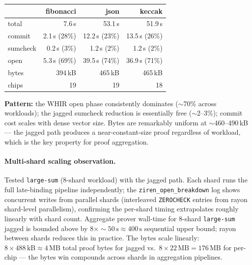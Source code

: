 \begin{tabular}{l@{\hspace{1em}}rrr}
\toprule
                & \textbf{fibonacci} & \textbf{json} & \textbf{keccak} \\
\midrule
total           & 7.6\,s   & 53.1\,s & 51.9\,s \\
commit          & 2.1\,s (28\%) & 12.2\,s (23\%) & 13.5\,s (26\%) \\
sumcheck        & 0.2\,s (3\%)  & 1.2\,s (2\%)   & 1.2\,s (2\%) \\
open            & 5.3\,s (69\%) & 39.5\,s (74\%) & 36.9\,s (71\%) \\
\midrule
bytes           & 394\,kB  & 465\,kB  & 465\,kB \\
chips           & 19       & 19       & 18 \\
\bottomrule
\end{tabular}

\textbf{Pattern:} the WHIR open phase consistently dominates
($\sim$70\% across workloads); the jagged sumcheck reduction is
essentially free ($\sim$2--3\%); commit cost scales with dense vector
size.  Bytes are remarkably uniform at $\sim$460--490\,kB --- the
jagged path produces a near-constant-size proof regardless of
workload, which is the key property for proof aggregation.

\paragraph{Multi-shard scaling observation.}
Tested \texttt{large-sum} (8-shard workload) with the jagged path.
Each shard runs the full late-binding pipeline independently; the
\texttt{ziren\_open\_breakdown} log shows concurrent writes from
parallel shards (interleaved \texttt{ZEROCHECK} entries from rayon
shard-level parallelism), confirming the per-shard timing
extrapolates roughly linearly with shard count.  Aggregate prover
wall-time for 8-shard \texttt{large-sum} jagged is bounded above by
$8 \times \sim 50\,\text{s} \approx 400\,\text{s}$ sequential
upper bound; rayon between shards reduces this in practice.  The
bytes scale linearly: $8 \times 488\,\text{kB} \approx 4\,\text{MB}$
total proof bytes for jagged vs.~$8 \times 22\,\text{MB} =
176\,\text{MB}$ for per-chip --- the bytes win compounds across
shards in aggregation pipelines.

